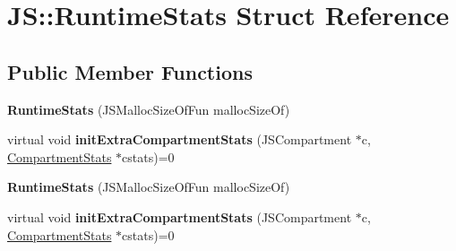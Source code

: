 \hypertarget{struct_j_s_1_1_runtime_stats}{\section{J\-S\-:\-:Runtime\-Stats Struct Reference}
\label{struct_j_s_1_1_runtime_stats}
}
\subsection*{Public Member Functions}
\begin{DoxyCompactItemize}
\item 
\hypertarget{struct_j_s_1_1_runtime_stats_ab989deef6d12824431186a6a1a87b8ba}{{\bfseries Runtime\-Stats} (J\-S\-Malloc\-Size\-Of\-Fun malloc\-Size\-Of)}\label{struct_j_s_1_1_runtime_stats_ab989deef6d12824431186a6a1a87b8ba}

\item 
\hypertarget{struct_j_s_1_1_runtime_stats_aaf5e8afaa80ac76493ee64b83faf8be3}{virtual void {\bfseries init\-Extra\-Compartment\-Stats} (J\-S\-Compartment $\ast$c, \hyperlink{struct_j_s_1_1_compartment_stats}{Compartment\-Stats} $\ast$cstats)=0}\label{struct_j_s_1_1_runtime_stats_aaf5e8afaa80ac76493ee64b83faf8be3}

\item 
\hypertarget{struct_j_s_1_1_runtime_stats_ab989deef6d12824431186a6a1a87b8ba}{{\bfseries Runtime\-Stats} (J\-S\-Malloc\-Size\-Of\-Fun malloc\-Size\-Of)}\label{struct_j_s_1_1_runtime_stats_ab989deef6d12824431186a6a1a87b8ba}

\item 
\hypertarget{struct_j_s_1_1_runtime_stats_aaf5e8afaa80ac76493ee64b83faf8be3}{virtual void {\bfseries init\-Extra\-Compartment\-Stats} (J\-S\-Compartment $\ast$c, \hyperlink{struct_j_s_1_1_compartment_stats}{Compartment\-Stats} $\ast$cstats)=0}\label{struct_j_s_1_1_runtime_stats_aaf5e8afaa80ac76493ee64b83faf8be3}

\end{DoxyCompactItemize}
